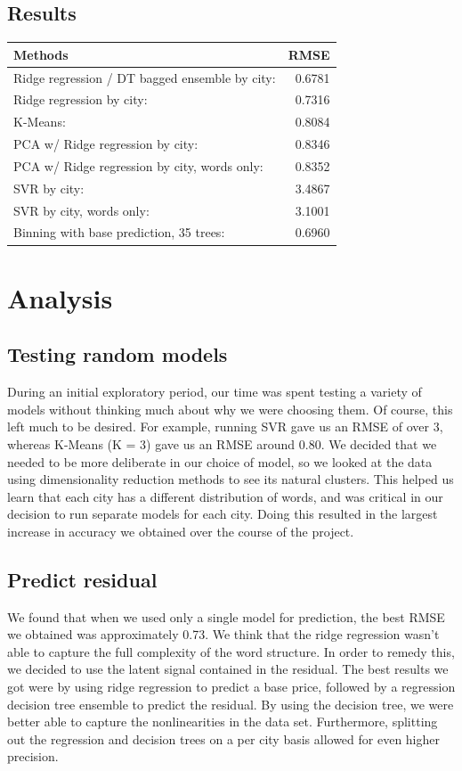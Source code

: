 \documentclass[11pt]{article}
\begin{document}
\subsection*{Results}
\begin{tabular}{| l || r |}
\hline
\textbf{Methods}									&	\textbf{RMSE}   \\ \hline \hline
Ridge regression / DT bagged ensemble by city:  	&	0.6781 \\ \hline
Ridge regression by city:							&	0.7316 \\ \hline
K-Means: 											&	0.8084 \\ \hline
PCA w/ Ridge regression by city: 					&	0.8346 \\ \hline
PCA w/ Ridge regression by city, words only: 		&	0.8352 \\ \hline
SVR by city: 										&	3.4867 \\ \hline
SVR by city, words only: 							&	3.1001 \\ \hline
Binning with base prediction, 35 trees: 			&	0.6960 \\ \hline
\end{tabular}
\section{Analysis}

\subsection{Testing random models}
During an initial exploratory period, our time was spent testing a variety of models without thinking much about why we were choosing them. Of course, this left much to be desired. For example, running SVR gave us an RMSE of over 3, whereas K-Means (K = 3) gave us an RMSE around 0.80. We decided that we needed to be more deliberate in our choice of model, so we looked at the data using dimensionality reduction methods to see its natural clusters. This helped us learn that each city has a different distribution of words, and was critical in our decision to run separate models for each city. Doing this resulted in the largest increase in accuracy we obtained over the course of the project.

\subsection{Predict residual}
We found that when we used only a single model for prediction, the best RMSE we obtained was approximately 0.73. We think that the ridge regression wasn't able to capture the full complexity of the word structure. In order to remedy this, we decided to use the latent signal contained in the residual. The best results we got were by using ridge regression to predict a base price, followed by a regression decision tree ensemble to predict the residual. By using the decision tree, we were better able to capture the nonlinearities in the data set. Furthermore, splitting out the regression and decision trees on a per city basis allowed for even higher precision.
\end{document}
